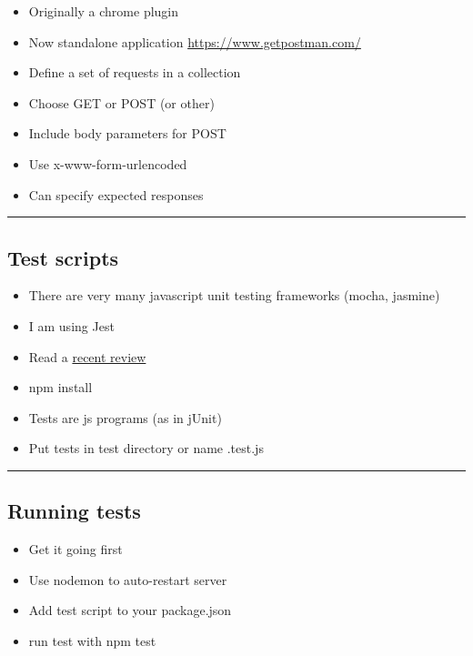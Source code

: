\documentclass{article}[18pt]
\providecommand{\tightlist}{%
  \setlength{\itemsep}{0pt}\setlength{\parskip}{0pt}}
\begin{document}
\begin{itemize}
\tightlist
\item
  Originally a chrome plugin
\item
  Now standalone application \url{https://www.getpostman.com/}
\item
  Define a set of requests in a collection
\item
  Choose GET or POST (or other)
\item
  Include body parameters for POST
\item
  Use x-www-form-urlencoded
\item
  Can specify expected responses
\end{itemize}

\begin{center}\rule{0.5\linewidth}{\linethickness}\end{center}

\hypertarget{test-scripts}{%
\subsection{Test scripts}\label{test-scripts}}

\begin{itemize}
\tightlist
\item
  There are very many javascript unit testing frameworks (mocha,
  jasmine)
\item
  I am using Jest
\item
  Read a
  \href{https://medium.com/welldone-software/an-overview-of-javascript-testing-in-2018-f68950900bc3}{recent
  review}
\item
  npm install
\item
  Tests are js programs (as in jUnit)
\item
  Put tests in test directory or name .test.js
\end{itemize}

\begin{center}\rule{0.5\linewidth}{\linethickness}\end{center}
\subsection{Running tests}
\begin{itemize}
\tightlist
\item
  Get it going first
\item
  Use nodemon to auto-restart server
\item
  Add test script to your package.json
\item
  run test with npm test
\end{itemize}
\end{document}

